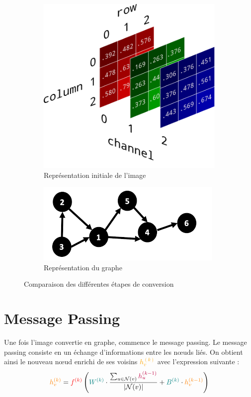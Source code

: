 \documentclass{article}
\begin{document}
\begin{figure}[h]
    \centering
    \begin{subfigure}[b]{0.4\textwidth}
        \includegraphics[width=\textwidth]{rgb.png}
        \caption{Représentation initiale de l'image}
        \label{fig:rgb}
    \end{subfigure}
    \hfill
    \begin{subfigure}[b]{0.4\textwidth}
        \includegraphics[width=\textwidth]{downloada.png}
        \caption{Représentation du graphe}
        \label{fig:graphe}
    \end{subfigure}
    \caption{Comparaison des différentes étapes de conversion}
    \label{fig:comparison}
\end{figure}

\section{Message Passing}
Une fois l'image convertie en graphe, commence le message passing. Le message passing consiste en un échange d'informations entre les nœuds liés. On obtient ainsi le nouveau nœud enrichi de ses voisins \textcolor{orange}{$h_v^{(k)}$} avec l'expression suivante :
\[
\textcolor{orange}{h_v^{(k)}} = \textcolor{red}{f^{(k)}} \left( \textcolor{teal}{W^{(k)}} \cdot \frac{\sum_{u \in \mathcal{N}(v)} \textcolor{purple}{h_u^{(k-1)}}}{|\mathcal{N}(v)|} + \textcolor{teal}{B^{(k)}} \cdot \textcolor{orange}{h_v^{(k-1)}} \right)
\]
\end{document}
